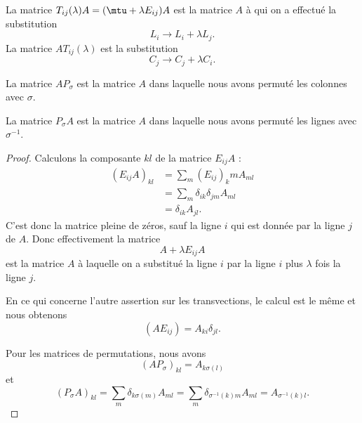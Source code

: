 \begin{lemma}   \label{LemyrAXQs}
    La matrice \( T_{ij}(\lambda)A=(\mtu+\lambda E_{ij})A\) est la matrice \( A\) à qui on a effectué la substitution
    \begin{equation}
        L_i\to L_i+\lambda L_j.
    \end{equation}
    La matrice \( AT_{ij}(\lambda)\) est la substitution 
    \begin{equation}
        C_j\to C_j+\lambda C_i.
    \end{equation}

    La matrice \( AP_{\sigma}\) est la matrice \( A\) dans laquelle nous avons permuté les colonnes avec \( \sigma\).

    La matrice \( P_{\sigma}A\) est la matrice \( A\) dans laquelle nous avons permuté les lignes avec \( \sigma^{-1}\).
\end{lemma}

\begin{proof}
    Calculons la composante \( kl\) de la matrice \( E_{ij}A\) :
    \begin{subequations}
        \begin{align}
            (E_{ij}A)_{kl}&=\sum_m(E_{ij})_kmA_{ml}\\
            &=\sum_m\delta_{ik}\delta_{jm}A_{ml}\\
            &=\delta_{ik}A_{jl}.
        \end{align}
    \end{subequations}
    C'est donc la matrice pleine de zéros, sauf la ligne \( i\) qui est donnée par la ligne \( j\) de \( A\). Donc effectivement la matrice
    \begin{equation}
        A+\lambda E_{ij}A
    \end{equation}
    est la matrice \( A\) à laquelle on a substitué la ligne \( i\) par la ligne \( i\) plus \( \lambda\) fois la ligne \( j\).

    En ce qui concerne l'autre assertion sur les transvections, le calcul est le même et nous obtenons
    \begin{equation}
        (AE_{ij})=A_{ki}\delta_{jl}.
    \end{equation}

    Pour les matrices de permutations, nous avons 
    \begin{equation}
        (AP_{\sigma})_{kl}=A_{k\sigma(l)}
    \end{equation}
    et
    \begin{equation}
        (P_{\sigma}A)_{kl}=\sum_m\delta_{k\sigma(m)}A_{ml}=\sum_m\delta_{\sigma^{-1}(k)m}A_{ml}=A_{\sigma^{-1}(k)l}.
    \end{equation}
\end{proof}

